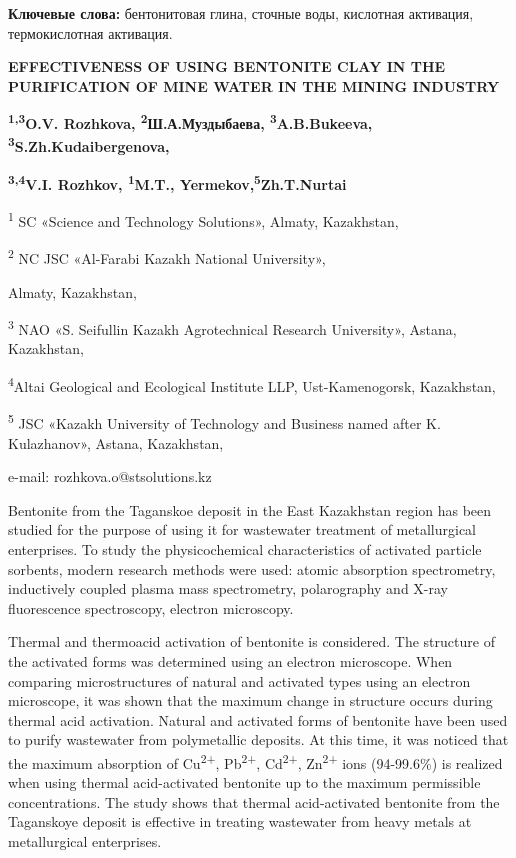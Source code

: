 {\bfseries Ключевые слова:} бентонитовая глина, сточные воды, кислотная
активация, термокислотная активация.

{\bfseries EFFECTIVENESS OF USING BENTONITE CLAY IN THE PURIFICATION OF
MINE WATER IN THE MINING INDUSTRY}

{\bfseries \textsuperscript{1,3}O.V. Rozhkova,
\textsuperscript{2}Ш.А.Муздыбаева, \textsuperscript{3}A.B.Bukeeva,
\textsuperscript{3}S.Zh.Kudaibergenova,}

{\bfseries \textsuperscript{3,4}V.I. Rozhkov, \textsuperscript{1}M.T.,
Yermekov,\textsuperscript{5}Zh.T.Nurtai}

\textsuperscript{1} SC «Science and Technology Solutions», Almaty,
Kazakhstan,

\textsuperscript{2} NC JSC «Al-Farabi Kazakh National University»,

Almaty, Kazakhstan,

\textsuperscript{3} NAO «S. Seifullin Kazakh Agrotechnical Research
University», Astana, Kazakhstan,

\textsuperscript{4}Altai Geological and Ecological Institute LLP,
Ust-Kamenogorsk, Kazakhstan,

\textsuperscript{5} JSC «Kazakh University of Technology and Business
named after K. Kulazhanov», Astana, Kazakhstan,

e-mail: rozhkova.o@stsolutions.kz

Bentonite from the Taganskoe deposit in the East Kazakhstan region has
been studied for the purpose of using it for wastewater treatment of
metallurgical enterprises. To study the physicochemical characteristics
of activated particle sorbents, modern research methods were used:
atomic absorption spectrometry, inductively coupled plasma mass
spectrometry, polarography and X-ray fluorescence spectroscopy, electron
microscopy.

Thermal and thermoacid activation of bentonite is considered. The
structure of the activated forms was determined using an electron
microscope. When comparing microstructures of natural and activated
types using an electron microscope, it was shown that the maximum change
in structure occurs during thermal acid activation. Natural and
activated forms of bentonite have been used to purify wastewater from
polymetallic deposits. At this time, it was noticed that the maximum
absorption of Cu\textsuperscript{2+}, Pb\textsuperscript{2+},
Cd\textsuperscript{2+}, Zn\textsuperscript{2+} ions (94-99.6\%) is
realized when using thermal acid-activated bentonite up to the maximum
permissible concentrations. The study shows that thermal acid-activated
bentonite from the Taganskoye deposit is effective in treating
wastewater from heavy metals at metallurgical enterprises.

